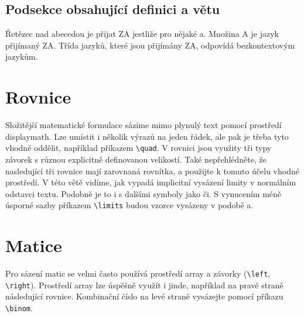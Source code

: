 \documentclass[a4paper,twocolumn,11pt]{article}[06-03-2022]
\begin{document}
\subsection{Podsekce obsahující definici a větu}
Řetězec nad abecedou je přijat ZA jestliže pro nějaké a. Množina A je jazyk přijímaný ZA. Třída jazyků, které jsou přijímány ZA, odpovídá bezkontextovým jazykům.

\section{Rovnice}
Složitější matematické formulace sázíme mimo plynulý text pomocí prostředí displaymath. Lze umístit i několik výrazů na jeden řádek, ale pak je třeba tyto vhodně oddělit, například příkazem \verb|\quad|. V rovnici jsou využity tři typy závorek s různou explicitně definovanou velikostí. Také nepřehlédněte, že nasledující tři rovnice mají zarovnaná rovnítka, a použijte k tomuto účelu vhodné prostředí. V této větě vidíme, jak vypadá implicitní vysázení limity v normálním odstavci textu. Podobně je to i s dalšími symboly jako či. S vynucením méně úsporné sazby příkazem \verb|\limits| budou vzorce vysázeny v podobě a.

\section{Matice}
Pro sázení matic se velmi často používá prostředí array a závorky (\verb|\left|, \verb|\right|). Prostředí array lze úspěšně využít i jinde, například na pravé straně následující rovnice. Kombinační číslo na levé straně vysázejte pomocí příkazu \verb|\binom|.
\end{document}
